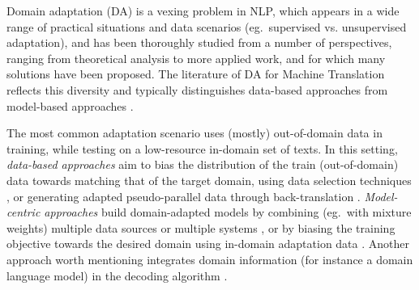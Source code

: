 \documentclass[11pt,a4paper]{article}
\newcommand{\fyTodo}[1]{\Todo[FY:]{\textcolor{orange}{#1}}}
\begin{document}

Domain adaptation (DA) is a vexing problem in NLP, which appears in a wide range of practical situations and data scenarios (eg.\ supervised vs. unsupervised adaptation), and  has been thoroughly  studied from a number of perspectives, ranging from theoretical analysis to more applied work, and for which many solutions have been proposed. The literature of DA for Machine Translation reflects this diversity and typically distinguishes data-based approaches from model-based approaches \cite{Chu2017comparison,Chu18asurvey}.

The most common adaptation scenario uses (mostly) out-of-domain data in training, while testing on a low-resource in-domain set of texts. In this setting, \emph{data-based approaches} aim to bias the distribution of the train (out-of-domain) data towards matching that of the target domain, using data selection techniques \cite{Moore2010selection,Axelrod2011domain,Duh2013selection}, or generating adapted pseudo-parallel data through back-translation  \cite{Utiyama2003measure,Wang2014neural,Wang2016connecting,Sennrich2016Mono}. \emph{Model-centric approaches} build domain-adapted models by combining (eg.\ with mixture weights) multiple data sources or multiple systems \cite{Foster07mixture,Wang17instance}, or by biasing the training objective towards the desired domain using in-domain adaptation data \cite{Luong2015SNMT,Freitag2016FastDA,Chen17costweighting}. Another approach worth mentioning integrates domain information (for instance a domain language model) in the decoding algorithm \cite{Gulcehre2016monolingual}.
\end{document}
